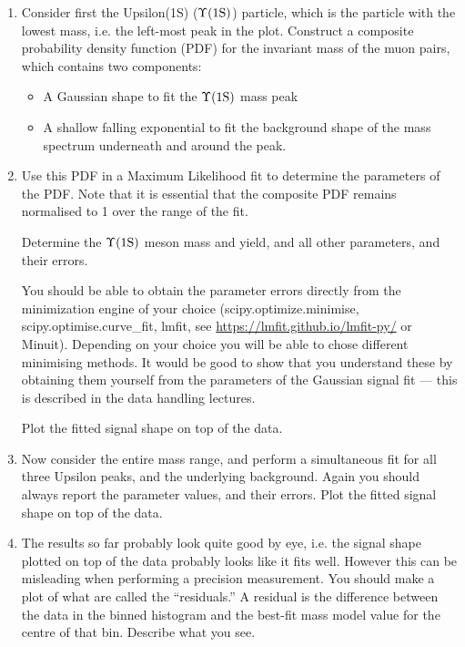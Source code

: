 \begin{enumerate}
\item Consider first the Upsilon(1S) ($\Upsilon \rm (1S)$) particle, which is the particle with the lowest mass, i.e. the left-most peak in the plot.
Construct a composite probability density function (PDF) for the invariant mass of the muon pairs, which contains two components:
\begin{itemize}
\item A Gaussian shape to fit the $\Upsilon \rm (1S)$ mass peak
\item A shallow falling exponential to fit the background shape of the mass spectrum underneath and around the peak.
\end{itemize}

\item	Use this PDF in a Maximum Likelihood fit to determine the parameters of the PDF.
Note that it is essential that the composite PDF remains normalised to 1 over the range of the fit.

Determine the $\Upsilon \rm (1S)$ meson mass and yield, and all other parameters, and their errors.

You should be able to obtain the parameter errors directly from the minimization engine of your choice (scipy.optimize.minimise, scipy.optimise.curve\_fit, lmfit, see \url{https://lmfit.github.io/lmfit-py/} or Minuit).
Depending on your choice you will be able to chose different minimising methods.
It would be good to show that you understand these by obtaining them yourself from the parameters of the Gaussian signal fit --- this is described in the data handling lectures.

Plot the fitted signal shape on top of the data.

\item Now consider the entire mass range, and perform a simultaneous fit for all three Upsilon peaks, and the underlying background.
Again you should always report the parameter values, and their errors.
Plot the fitted signal shape on top of the data.

\item The results so far probably look quite good by eye, i.e. the signal shape plotted on top of the data probably looks like it fits well.
However this can be misleading when performing a precision measurement.
You should make a plot of what are called the ``residuals.''
A residual is the difference between the data in the binned histogram and the best-fit mass model value for the centre of that bin.
Describe what you see.


\end{enumerate}
